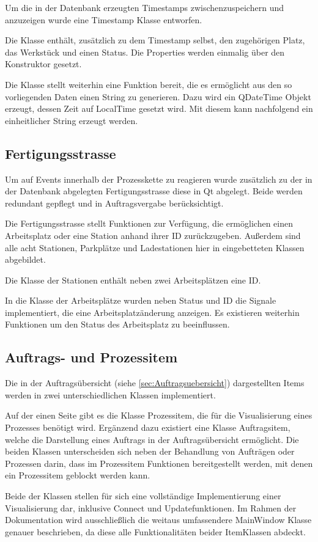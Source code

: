 Um die in der Datenbank erzeugten Timestamps zwischenzuspeichern und anzuzeigen wurde eine Timestamp Klasse entworfen. 

Die Klasse enthält, zusätzlich zu dem Timestamp selbst, den zugehörigen Platz, das Werkstück und einen Status. Die Properties werden einmalig über den Konstruktor gesetzt. 

Die Klasse stellt weiterhin eine Funktion bereit, die es ermöglicht aus den so vorliegenden Daten einen String zu generieren. Dazu wird ein QDateTime Objekt erzeugt, dessen Zeit auf LocalTime gesetzt wird. Mit diesem kann nachfolgend ein einheitlicher String erzeugt werden. 

\subsection{Fertigungsstrasse}

Um auf Events innerhalb der Prozesskette zu reagieren wurde zusätzlich zu der in der Datenbank abgelegten Fertigungsstrasse diese in Qt abgelegt. Beide werden redundant gepflegt und in Auftragsvergabe berücksichtigt. 

Die Fertigungsstrasse stellt Funktionen zur Verfügung, die ermöglichen einen Arbeitsplatz oder eine Station anhand ihrer ID zurückzugeben. Außerdem sind alle acht Stationen, Parkplätze und Ladestationen hier in eingebetteten Klassen abgebildet. 

Die Klasse der Stationen enthält neben zwei Arbeitsplätzen eine ID. 

In die Klasse der Arbeitsplätze wurden neben Status und ID die Signale implementiert, die eine Arbeitsplatzänderung anzeigen. Es existieren weiterhin Funktionen um den Status des Arbeitsplatz zu beeinflussen. 

\subsection{Auftrags- und Prozessitem}
\label{sec:Auftragsitem}

Die in der Auftragsübersicht (siehe \ref{sec:Auftragsuebersicht}) dargestellten Items werden in zwei unterschiedlichen Klassen implementiert. 

Auf der einen Seite gibt es die Klasse Prozessitem, die für die Visualisierung eines Prozesses benötigt wird. Ergänzend dazu existiert eine Klasse Auftragsitem, welche die Darstellung eines Auftrags in der Auftragsübersicht ermöglicht. Die beiden Klassen unterscheiden sich neben der Behandlung von Aufträgen oder Prozessen darin, dass im Prozessitem Funktionen bereitgestellt werden, mit denen ein Prozessitem geblockt werden kann.

Beide der Klassen stellen für sich eine vollständige Implementierung einer Visualisierung dar, inklusive Connect und Updatefunktionen. Im Rahmen der Dokumentation wird ausschließlich die weitaus umfassendere MainWindow Klasse genauer beschrieben, da diese alle Funktionalitäten beider ItemKlassen abdeckt. 

